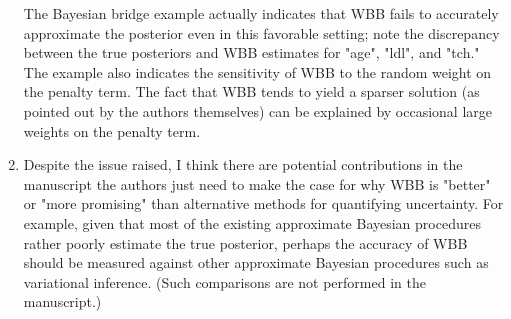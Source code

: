 \documentclass[11pt]{article}
\begin{document}
\begin{enumerate}
The Bayesian bridge example actually indicates that WBB fails to accurately approximate the posterior even in this favorable setting; note the discrepancy between the true posteriors and WBB estimates for "age", "ldl", and "tch." The example also indicates the sensitivity of WBB to the random weight on the penalty term. The fact that WBB tends to yield a sparser solution (as pointed out by the authors themselves) can be explained by occasional large weights on the penalty term.

\item Despite the issue raised, I think there are potential contributions in the manuscript the authors just need to make the case for why WBB is "better" or "more promising" than alternative methods for quantifying uncertainty. For example, given that most of the existing approximate Bayesian procedures rather poorly estimate the true posterior, perhaps the accuracy of WBB should be measured against other approximate Bayesian procedures such as variational inference. (Such comparisons are not performed in the manuscript.)
\end{enumerate}
\end{document}
